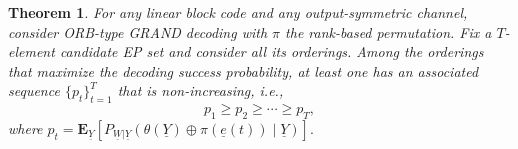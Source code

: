 \documentclass[letterpaper,draftclsnofoot,onecolumn]{IEEEtran}
\newtheorem{theorem}{Theorem}%
\begin{document}
\begin{theorem}\label{th:linear_opti}
For any linear block code and any output-symmetric channel, consider ORB-type GRAND decoding with $\pi$ the rank-based permutation. Fix a $T$-element candidate EP set and consider all its orderings. Among the orderings that maximize the decoding success probability, at least one has an associated sequence $\{p_t\}_{t=1}^{T}$ that is non-increasing, i.e.,
\begin{equation}\label{eq:opti_linear_condition}
    p_1 \ge p_2 \ge \cdots \ge p_{T},
\end{equation}
where $p_t=\mathbf{E}_{\underline{Y}}\!\left[P_{\underline{W}|\underline{Y}}(\theta(\underline{Y})\oplus\pi(\underline{e}(t))\mid\underline{Y})\right].$

\end{theorem}
\end{document}
